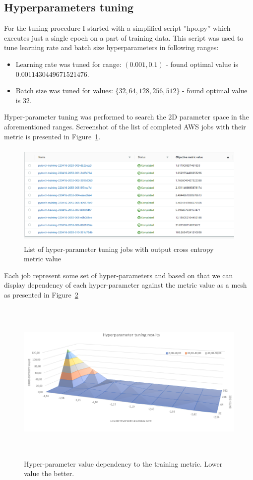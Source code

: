 \documentclass{article}
\begin{document}
\subsection{Hyperparameters tuning}
For the tuning procedure I started with a simplified script ''hpo.py'' which executes just a single epoch on a part of training data. This script was used to tune learning rate and batch size hyperparameters in following ranges:
\begin{itemize}
\item Learning rate was tuned for range: $(0.001, 0.1)$ - found optimal value is $0.0011430449671521476$.
\item Batch size was tuned for values: $\{32, 64, 128, 256, 512\}$ - found optimal value is $32$.
\end{itemize}

Hyper-parameter tuning was performed to search the 2D parameter space in the aforementioned ranges. Screenshot of the list of completed AWS jobs with their metric is presented in Figure~\ref{fig:hp_tuning}.
\begin{figure}[ht]
	\centering
	\includegraphics[height=50mm]{hp_tuning.png}
	\caption{List of hyper-parameter tuning jobs with output cross entropy metric value}
	\label{fig:hp_tuning}
\end{figure}

Each job represent some set of hyper-parameters and based on that we can display dependency of each hyper-parameter against the metric value as a mesh as presented in Figure~\ref{fig:hp_mesh}
\begin{figure}[ht]
	\centering
	\includegraphics[height=80mm]{hp_mesh.png}
	\caption{Hyper-parameter value dependency to the training metric. Lower value the better.}
	\label{fig:hp_mesh}
\end{figure}
\end{document}
